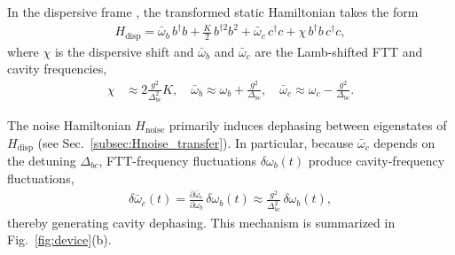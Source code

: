In the dispersive frame \cite{Blais2021}, the transformed static Hamiltonian takes the form
\begin{align}
\label{Hdisp}
H_\text{disp} =
\bar{\omega}_b\, b^\dagger b
+ \frac{K}{2}\, b^{\dagger 2} b^{2}
+ \bar{\omega}_c\, c^\dagger c
+ \chi\, b^\dagger b\, c^\dagger c,
\end{align}
where $\chi$ is the dispersive shift and $\bar{\omega}_b$ and $\bar{\omega}_c$ are the Lamb-shifted FTT and cavity frequencies,
\begin{align}
\chi &\approx 2\frac{g^2}{\Delta_{bc}^2}K,\quad
\bar{\omega}_b \approx \omega_b + \frac{g^2}{\Delta_{bc}}, \quad
\bar{\omega}_c \approx \omega_c - \frac{g^2}{\Delta_{bc}}.
\end{align}

The noise Hamiltonian $H_{\mathrm{noise}}$ primarily induces dephasing between eigenstates of $H_\text{disp}$ (see Sec.~\ref{subsec:Hnoise_transfer}). In particular, because $\bar{\omega}_c$ depends on the detuning $\Delta_{bc}$, FTT-frequency fluctuations $\delta\omega_b(t)$ produce cavity-frequency fluctuations,
\begin{align}
\delta\bar{\omega}_c(t)
= \frac{\partial \bar{\omega}_c}{\partial \omega_b}\,\delta\omega_b(t)
\approx \frac{g^2}{\Delta_{bc}^2}\,\delta\omega_b(t),
\end{align}
thereby generating cavity dephasing. This mechanism is summarized in Fig.~\ref{fig:device}(b).
